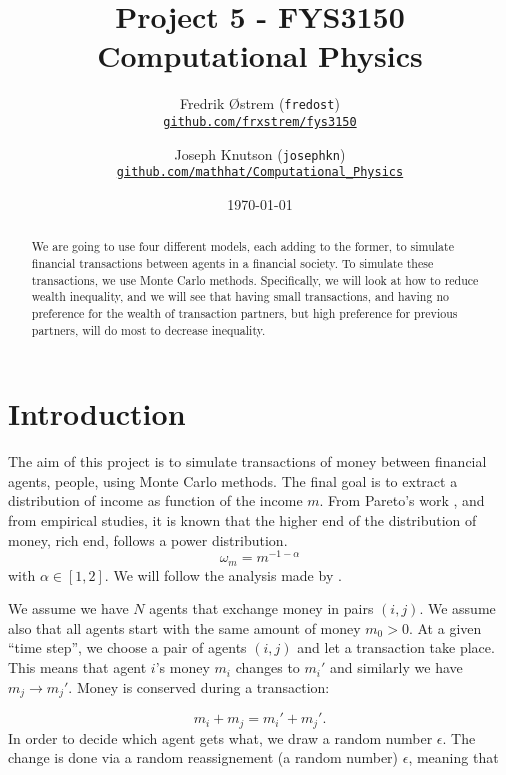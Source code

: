 \documentclass[12pt,a4paper]{article}
\begin{document}
\title{Project 5 - FYS3150 Computational Physics}
\author{
  Fredrik Østrem (\texttt{fredost}) \\
    \href{https://github.com/frxstrem/fys3150/tree/master/project5}{\tt github.com/frxstrem/fys3150}
  \and
  Joseph Knutson (\texttt{josephkn}) \\
    \href{https://github.com/mathhat/Computational_Physics/tree/master/prosjekt5}{\tt github.com/mathhat/Computational\_Physics}
}
\date{\today}

\maketitle

\begin{abstract}
  We are going to use four different models, each adding to the former, to simulate financial transactions between
  agents in a financial society. To simulate these transactions, we use Monte Carlo methods. Specifically, we will look at how to reduce wealth inequality, and we will see that having small transactions, and having no preference for the wealth of transaction partners, but high preference for previous partners, will do most to decrease inequality.
\end{abstract}

\tableofcontents

\clearpage

\section{Introduction}
The aim of this project is to simulate transactions of money between financial
agents, people, using Monte Carlo methods. The final goal is to extract a distribution of
income as function of the income $m$. From Pareto’s work
\autocite{pareto},
and from empirical studies, it is known that the higher end of the distribution of money, rich end, follows a power distribution.
$$\omega_{m} = m^{-1-\alpha} $$
with $\alpha\in [1,2]$. We will follow the analysis made by
\textcite{patriarca}.

We assume we have $N$ agents that exchange money in pairs $(i,j)$. We assume also that all agents
start with the same amount of money $m_0 > 0$. At a given ``time step'', we choose a pair
of agents $(i,j)$ and let a transaction take place. This means that agent $i$'s money $m_i$ changes
to $m_i'$ and similarly we have $m_j\rightarrow m_j'$.
Money is conserved during a transaction:

\begin{equation}
  m_i+m_j=m_i'+m_j'.
  \label{eq:conserve}
\end{equation}
In order to decide which agent gets what, we draw a random number $\epsilon$.
The change is done via a random reassignement (a random number) $\epsilon$, meaning that
\end{document}
